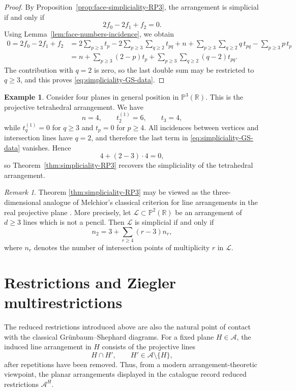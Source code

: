 \documentclass[11pt]{article}
\theoremstyle{definition}
\newtheorem{example}[theorem]{Example}
\theoremstyle{remark}
\newtheorem{remark}[theorem]{Remark}
\newcommand{\PP}{\mathbb P}
\newcommand{\RR}{\mathbb R}
\newcommand{\cA}{\mathcal A}
\begin{document}
\begin{proof}
By Proposition~\ref{prop:face-simpliciality-RP3}, the arrangement is
simplicial if and only if
\[
2f_0-2f_1+f_2=0.
\]
Using Lemma~\ref{lem:face-numbers-incidence}, we obtain
\[
\begin{aligned}
0= 2f_0-2f_1+f_2
&=
2\sum_{p\geq 3}t_p
-
2\sum_{p\geq 3}\sum_{q\geq 2}t_{pq}
+n
+
\sum_{p\geq 3}\sum_{q\geq 2}q\,t_{pq}
-
\sum_{p\geq 3}p\,t_p\\
&=
n
+
\sum_{p\geq 3}(2-p)t_p
+
\sum_{p\geq 3}\sum_{q\geq 2}(q-2)t_{pq}.
\end{aligned}
\]
The contribution with $q=2$ is zero, so the last double sum may be
restricted to $q\geq 3$, and this proves \eqref{eq:simpliciality-GS-data}.
\end{proof}

\begin{example}
\label{ex:four-planes-general-position}
Consider four planes in general position in $\PP^3(\RR)$. This is the
projective tetrahedral arrangement. We have
\[
n=4,
\qquad
t_2^{(1)}=6,
\qquad
t_3=4,
\]
while $t_q^{(1)}=0$ for $q\geq 3$ and $t_p=0$ for $p\geq 4$. All incidences
between vertices and intersection lines have $q=2$, and therefore the
last term in \eqref{eq:simpliciality-GS-data} vanishes. Hence
\[
4+(2-3)\cdot 4=0,
\]
so Theorem~\ref{thm:simpliciality-RP3} recovers the simpliciality of the
tetrahedral arrangement.
\end{example}

\begin{remark}
Theorem \ref{thm:simpliciality-RP3} may be viewed as the three-dimensional analogue of Melchior's classical criterion for line arrangements in the real projective plane \cite{Melchior}. More precisely, let $\mathcal{L}\subset \mathbb{P}^{2}(\mathbb{R})$ be an arrangement of $d\geq 3$ lines which is not a pencil. Then $\mathcal{L}$ is simplicial if and only if
\[
n_{2}=3+\sum_{r\geq 4}(r-3)n_{r},
\]
where $n_r$ denotes the number of intersection points of multiplicity $r$ in $\mathcal{L}$.
\end{remark}


\section{Restrictions and Ziegler multirestrictions}
\label{sec:ziegler-restrictions}

The reduced restrictions introduced above are also the natural point of
contact with the classical Gr\"unbaum--Shephard diagrams. For a fixed plane
$H\in\cA$, the induced line arrangement in $H$ consists of the
projective lines
\[
H\cap H',\qquad H'\in\cA\setminus\{H\},
\]
after repetitions have been removed. Thus, from a modern
arrangement-theoretic viewpoint, the planar arrangements displayed in the
catalogue record reduced restrictions $\cA^H$.
\end{document}
